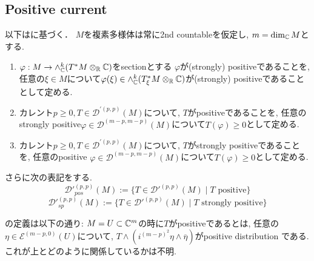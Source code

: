 \subsection{Positive current}
以下は\cite[Ch.3]{Dem}に基づく．
$M$を複素多様体は常に2nd countableを仮定し, $m=\dim_{\mathbb{C}} M$とする. 



\begin{tcolorbox}[mybox]
\begin{defn}
\label{defn-M-6.4.5}
\begin{enumerate}
\item $\varphi : M \to \wedge_{\mathbb{C}}^{k}(T^{*}M \otimes_{\mathbb{R}} \mathbb{C})$をsectionとする
$\varphi$が(strongly) positiveであることを, 
任意の$\xi \in M$について$\varphi(\xi) \in\wedge_{\mathbb{C}}^{k}(T^{*}_{\xi}M \otimes_{\mathbb{R}} \mathbb{C})$が(strongly) positiveであることとして定める.  
\item カレント$p \ge 0, T \in \mathcal{D}^{'(p,p)}(M)$について, 
$T$がpositiveであることを, 任意のstrongly positive$\varphi \in  \mathcal{D}^{(m-p,m-p)}(M)$について$T(\varphi) \ge 0$として定める. 
\item カレント$p \ge 0, T \in \mathcal{D}^{'(p,p)}(M)$について, 
$T$がstrongly positiveであることを, 任意のpositive $\varphi \in  \mathcal{D}^{(m-p,m-p)}(M)$について$T(\varphi) \ge 0$として定める. 
\end{enumerate}
さらに次の表記をする. 
$$
{\mathcal{D}'}^{(p,p)}_{pos}(M)
:= \{ T \in {\mathcal{D}'}^{(p,p)}(M) \mid \text{$T$ positive} \}
$$
$$
{\mathcal{D}'}^{(p,p)}_{sp}(M)
:= \{ T \in {\mathcal{D}'}^{(p,p)}(M) \mid \text{$T$ strongly positive} \}
$$
\end{defn}
\end{tcolorbox}

\begin{rem}
\cite{NO}の定義は以下の通り:
$M=U \subset \mathbb{C}^m$の時に$T$がpositiveであるとは, 任意の$\eta \in \mathcal{E}^{(m-p, 0)}(U)$について, 
$T \wedge (i^{(m-p)^2} \eta \wedge \overline{\eta})$がpositive distribution である. 
これが上とどのように関係しているかは不明. 
\end{rem}



